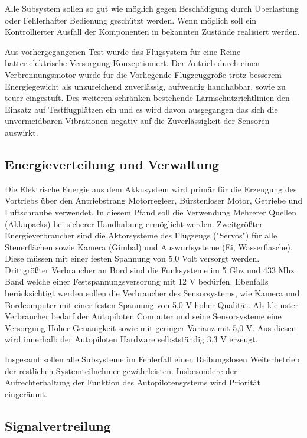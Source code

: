 Alle Subsystem sollen so gut wie möglich gegen Beschädigung durch Überlastung oder Fehlerhafter Bedienung geschützt werden.
Wenn möglich soll ein Kontrollierter Ausfall der Komponenten in bekannten Zustände realisiert werden.

Aus vorhergegangenen Test wurde das Flugsystem für eine Reine batterielektrische Versorgung Konzeptioniert.
Der Antrieb durch einen Verbrennungsmotor wurde für die Vorliegende Flugzeuggröße trotz besserem Energiegewicht als unzureichend zuverlässig, aufwendig handhabbar, sowie zu teuer eingestuft.
Des weiteren schränken bestehende Lärmschutzrichtlinien den Einsatz auf Testflugplätzen ein und es wird davon ausgegangen das sich die unvermeidbaren Vibrationen negativ auf die Zuverlässigkeit der Sensoren auswirkt.

\subsection{Energieverteilung und Verwaltung}

Die Elektrische Energie aus dem Akkusystem wird primär für die Erzeugung des Vortriebs über den Antriebstrang Motorregleer, Bürstenloser Motor, Getriebe und Luftschraube verwendet.
In diesem Pfand soll die Verwendung Mehrerer Quellen (Akkupacks) bei sicherer Handhabung ermöglicht werden.
Zweitgrößter Energieverbraucher sind die Aktorsysteme des Flugzeugs ("Servos") für alle Steuerflächen sowie Kamera (Gimbal) und Auswurfsysteme (Ei, Wasserflasche). Diese müssen mit einer festen Spannung von 5,0 Volt versorgt werden.
Drittgrößter Verbraucher an Bord sind die Funksysteme im 5 Ghz und 433 Mhz Band welche einer Festspannungsversorung mit 12 V  bedürfen.
Ebenfalls berücksichtigt werden sollen die Verbraucher des Sensorsystems, wie Kamera und Bordcomputer mit einer festen Spannung von 5,0 V hoher Qualität.
Als kleinster Verbraucher bedarf der Autopiloten Computer und seine Sensorsysteme eine Versorgung Hoher Genauigkeit sowie mit geringer Varianz mit 5,0 V.
Aus diesen wird innerhalb der Autopiloten Hardware selbstständig 3,3 V erzeugt.

Insgesamt sollen alle Subsysteme im Fehlerfall einen Reibungslosen Weiterbetrieb der restlichen Systemteilnehmer gewährleisten. Insbesondere der Aufrechterhaltung der Funktion des Autopilotensystems wird Priorität eingeräumt.


\subsection{Signalvertreilung}

